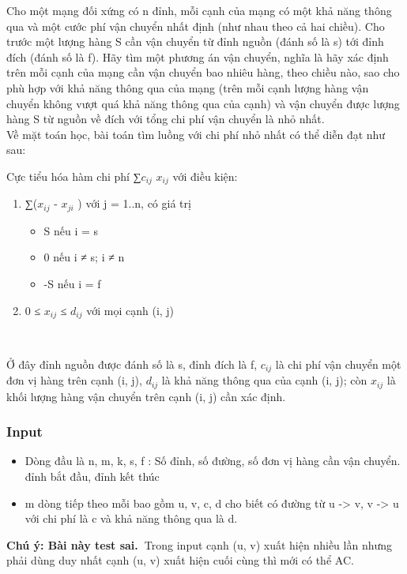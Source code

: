 

Cho một mạng đối xứng có n đỉnh, mỗi cạnh của mạng có một khả năng thông qua và một cước phí vận chuyển nhất định (như nhau theo cả hai chiều). Cho trước một lượng hàng S cần vận chuyển từ đỉnh nguồn (đánh số là s) tới đỉnh đích (đánh số là f). Hãy tìm một phương án vận chuyển, nghĩa là hãy xác định trên mỗi cạnh của mạng cần vận chuyển bao nhiêu hàng, theo chiều nào, sao cho phù hợp với khả năng thông qua của mạng (trên mỗi cạnh lượng hàng vận chuyển không vượt quá khả năng thông qua của cạnh) và vận chuyển được lượng hàng S từ nguồn về đích với tổng chi phí vận chuyển là nhỏ nhất.
\\Về mặt toán học, bài toán tìm luồng với chi phí nhỏ nhất có thể diễn đạt như sau:

Cực tiểu hóa hàm chi phí ∑$c_{ij}$ $x_{ij}$ với điều kiện:
\begin{enumerate}
	\item ∑($x_{ij}$ - $x_{ji}$ ) với j = 1..n, có giá trị
\begin{itemize}
	\item S nếu i = s
	\item 0 nếu i ≠ s; i ≠ n
	\item -S nếu i = f
\end{itemize}
	\item 0 ≤ $x_{ij}$ ≤ $d_{ij}$ với mọi cạnh (i, j)

 
\end{enumerate}

Ở đây đỉnh nguồn được đánh số là s, đỉnh đích là f, $c_{ij}$ là chi phí vận chuyển một đơn vị hàng trên cạnh (i, j), $d_{ij}$ là khả năng thông qua của cạnh (i, j); còn $x_{ij}$ là khối lượng hàng vận chuyển trên cạnh (i, j) cần xác định.

\subsubsection{Input}
\begin{itemize}
	\item Dòng đầu là n, m, k, s, f : Số đỉnh, số đường, số đơn vị hàng cần vận chuyển. đỉnh bắt đầu, đỉnh kết thúc
	\item m dòng tiếp theo mỗi bao gồm u, v, c, d cho biết có đường từ u -> v, v -> u với chi phí là c và khả năng thông qua là d.
\end{itemize}

\textbf{Chú ý: Bài này test sai. }Trong input cạnh (u, v) xuất hiện nhiều lần nhưng phải dùng duy nhất cạnh (u, v) xuất hiện cuối cùng thì mới có thể AC.

